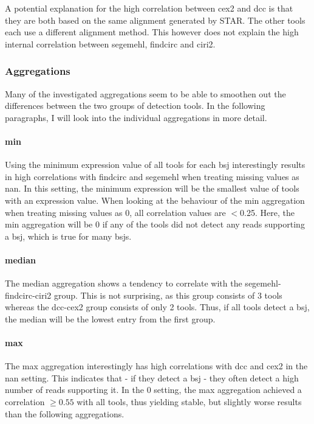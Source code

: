 A potential explanation for the high correlation between \gls{cex2} and
\gls{dcc} is that they are both based on the same alignment generated by
STAR\supercite{dobin_star_2013}.
The other tools each use a different alignment method.
This however does not explain the high internal correlation between
\gls{segemehl}, \gls{findcirc} and \gls{ciri2}.

\subsubsection{Aggregations}
Many of the investigated aggregations seem to be able to smoothen out the
differences between the two groups of detection tools.
In the following paragraphs, I will look into the individual aggregations in
more detail.

\paragraph{min}
Using the minimum expression value of all tools for each \gls{bsj}
interestingly results in high correlations with \gls{findcirc} and
\gls{segemehl} when treating missing values as \gls{nan}.
In this setting, the minimum expression will be the smallest value of tools
with an expression value.
When looking at the behaviour of the min aggregation when treating missing
values as 0, all correlation values are $<$0.25.
Here, the min aggregation will be 0 if any of the tools did not detect any
reads supporting a \gls{bsj}, which is true for many \glspl{bsj}.

\paragraph{median}
The median aggregation shows a tendency to correlate with the
\gls{segemehl}-\gls{findcirc}-\gls{ciri2} group.
This is not surprising, as this group consists of 3 tools whereas the
\gls{dcc}-\gls{cex2} group consists of only 2 tools.
Thus, if all tools detect a \gls{bsj}, the median will be the lowest entry from
the first group.

\paragraph{max}
The max aggregation interestingly has high correlations with \gls{dcc} and
\gls{cex2} in the \gls{nan} setting.
This indicates that - if they detect a \gls{bsj} - they often detect a high
number of reads supporting it.
In the 0 setting, the max aggregation achieved a correlation $\geq 0.55$ with
all tools, thus yielding stable, but slightly worse results than the following
aggregations.

